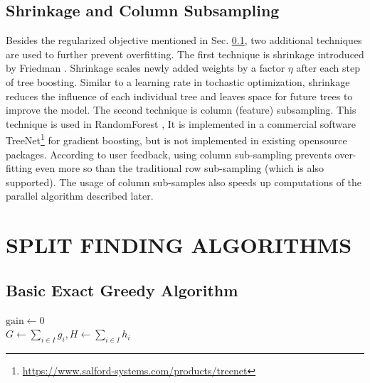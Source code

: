 \documentclass[sigconf]{acmart}
\begin{document}
\subsection{Shrinkage and Column Subsampling}
\label{subsec:Shrinkage and Column Subsampling}
Besides the regularized objective mentioned in Sec. \ref{subsec:Shrinkage and Column Subsampling}, two additional 
techniques are used to further prevent overfitting. The first technique is shrinkage introduced by Friedman \cite{friedman2002stochastic}. 
Shrinkage scales newly added weights by a factor $\eta$ after each step of tree boosting. Similar to a learning rate
in tochastic optimization, shrinkage reduces the influence of each individual tree and leaves space for future trees 
to improve the model. The second technique is column (feature) subsampling. This technique is used in RandomForest \cite{breiman2001random, friedman2003importance}, It is implemented in a commercial software TreeNet\footnote{\url{https://www.salford-systems.com/products/treenet}} for gradient boosting, but is not implemented in existing
opensource packages. According to user feedback, using column sub-sampling prevents over-fitting even more so than
the traditional row sub-sampling (which is also supported). The usage of column sub-samples also speeds up 
computations of the parallel algorithm described later.

\section{SPLIT FINDING ALGORITHMS}
\label{sec:SPLIT FINDING ALGORITHMS}
\subsection{Basic Exact Greedy Algorithm}
\label{subsec:Basic Exact Greedy Algorithm}

\begin{algorithm} [t]

    $\text{gain} \leftarrow 0$\\
    $G \leftarrow \sum_{i \in I} g_i, H \leftarrow \sum_{i \in I} h_i$\\
    \caption{Exact Greedy Algorithm for Split Finding}
    \label{alg:Algorithm1}
\end{algorithm}
\end{document}
